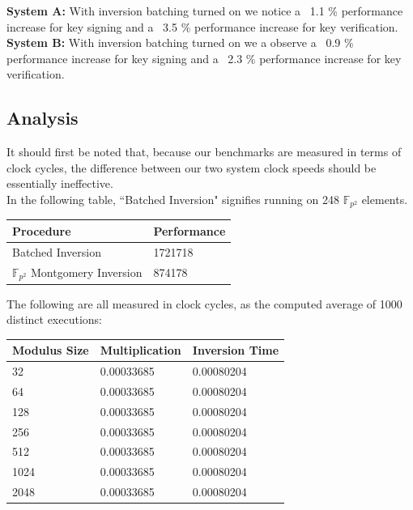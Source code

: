\textbf{System A:} With inversion batching turned on we notice a ~1.1 \% performance increase for key signing and a ~3.5 \% performance increase for key verification.\\

\textbf{System B:} With inversion batching turned on we a observe a ~0.9 \% performance increase for key signing and a ~2.3 \% performance increase for key verification.\\

\subsection{Analysis}

It should first be noted that, because our benchmarks are measured in terms of clock cycles, the difference between our two system clock speeds should be essentially ineffective. \\

In the following table, ``Batched Inversion" signifies running  on 248 $\mathbb{F}_{p^{2}}$ elements.

\begin{center}
\begin{tabular}{@{}ll@{}}
	\toprule
	Procedure & Performance \\
	\midrule
	Batched Inversion & 1721718\\
	$\mathbb{F}_{p^{2}}$ Montgomery Inversion & 874178\\
	\bottomrule
\end{tabular}
\end{center}

The following are all measured in clock cycles, as the computed average of 1000 distinct executions:

\begin{center}
\begin{tabular}{@{}lll@{}}
	\toprule
	Modulus Size & Multiplication & Inversion Time \\
	\midrule
	32 & 0.00033685 & 0.00080204\\
	64 & 0.00033685 & 0.00080204\\
	128 & 0.00033685 & 0.00080204\\
	256 & 0.00033685 & 0.00080204\\
	512 & 0.00033685 & 0.00080204\\
	1024 & 0.00033685 & 0.00080204\\
	2048 & 0.00033685 & 0.00080204\\
	\bottomrule
\end{tabular}
\end{center}